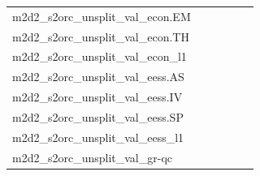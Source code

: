 \documentclass[dvipsnames]{article}
\begin{document}
\begin{appendix}
{\begin{longtable}{m{6cm}m{1.7cm}m{1.7cm}m{1.7cm}m{1.7cm}m{1.7cm}}
	m2d2\_s2orc\_unsplit\_val\_econ.EM  & \colorbox[HTML]{c5e799}{\makebox[\mywidth][c]{11.62}} & \colorbox[HTML]{e1f3a9}{\makebox[\mywidth][c]{11.76}} & \colorbox[HTML]{ffffe5}{\makebox[\mywidth][c]{13.73}} & \colorbox[HTML]{d3eda0}{\makebox[\mywidth][c]{11.68}} & \colorbox[HTML]{77c578}{\makebox[\mywidth][c]{11.41}}\\
	m2d2\_s2orc\_unsplit\_val\_econ.TH  & \colorbox[HTML]{77c578}{\makebox[\mywidth][c]{9.75}} & \colorbox[HTML]{e8f6ae}{\makebox[\mywidth][c]{10.16}} & \colorbox[HTML]{ffffe5}{\makebox[\mywidth][c]{11.99}} & \colorbox[HTML]{ccea9c}{\makebox[\mywidth][c]{9.99}} & \colorbox[HTML]{acdc8d}{\makebox[\mywidth][c]{9.88}}\\
	m2d2\_s2orc\_unsplit\_val\_econ\_l1  & \colorbox[HTML]{77c578}{\makebox[\mywidth][c]{9.75}} & \colorbox[HTML]{e8f6ae}{\makebox[\mywidth][c]{10.16}} & \colorbox[HTML]{ffffe5}{\makebox[\mywidth][c]{11.99}} & \colorbox[HTML]{ccea9c}{\makebox[\mywidth][c]{9.99}} & \colorbox[HTML]{acdc8d}{\makebox[\mywidth][c]{9.88}}\\
	m2d2\_s2orc\_unsplit\_val\_eess.AS  & \colorbox[HTML]{bee496}{\makebox[\mywidth][c]{12.05}} & \colorbox[HTML]{d9f0a3}{\makebox[\mywidth][c]{12.14}} & \colorbox[HTML]{ffffe5}{\makebox[\mywidth][c]{13.88}} & \colorbox[HTML]{ccea9c}{\makebox[\mywidth][c]{12.09}} & \colorbox[HTML]{77c578}{\makebox[\mywidth][c]{11.88}}\\
	m2d2\_s2orc\_unsplit\_val\_eess.IV  & \colorbox[HTML]{ccea9c}{\makebox[\mywidth][c]{13.77}} & \colorbox[HTML]{e3f4aa}{\makebox[\mywidth][c]{13.89}} & \colorbox[HTML]{ffffe5}{\makebox[\mywidth][c]{15.71}} & \colorbox[HTML]{c8e89a}{\makebox[\mywidth][c]{13.76}} & \colorbox[HTML]{77c578}{\makebox[\mywidth][c]{13.54}}\\
	m2d2\_s2orc\_unsplit\_val\_eess.SP  & \colorbox[HTML]{c2e698}{\makebox[\mywidth][c]{11.29}} & \colorbox[HTML]{e6f5ad}{\makebox[\mywidth][c]{11.45}} & \colorbox[HTML]{ffffe5}{\makebox[\mywidth][c]{12.94}} & \colorbox[HTML]{bde395}{\makebox[\mywidth][c]{11.28}} & \colorbox[HTML]{77c578}{\makebox[\mywidth][c]{11.13}}\\
	m2d2\_s2orc\_unsplit\_val\_eess\_l1  & \colorbox[HTML]{ccea9c}{\makebox[\mywidth][c]{13.77}} & \colorbox[HTML]{e3f4aa}{\makebox[\mywidth][c]{13.89}} & \colorbox[HTML]{ffffe5}{\makebox[\mywidth][c]{15.71}} & \colorbox[HTML]{c8e89a}{\makebox[\mywidth][c]{13.76}} & \colorbox[HTML]{77c578}{\makebox[\mywidth][c]{13.54}}\\
	m2d2\_s2orc\_unsplit\_val\_gr-qc  & \colorbox[HTML]{b3df91}{\makebox[\mywidth][c]{12.84}} & \colorbox[HTML]{dcf1a5}{\makebox[\mywidth][c]{12.99}} & \colorbox[HTML]{ffffe5}{\makebox[\mywidth][c]{14.68}} & \colorbox[HTML]{b3df91}{\makebox[\mywidth][c]{12.84}} & \colorbox[HTML]{77c578}{\makebox[\mywidth][c]{12.71}}\\

\end{longtable}}
\end{appendix}
\end{document}
